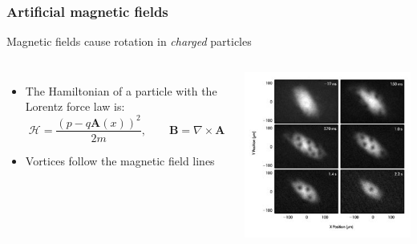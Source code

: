 \documentclass{beamer}
\begin{document}
\begin{frame}
\frametitle{Artificial magnetic fields}
\begin{center}
Magnetic fields cause rotation in \textit{charged} particles
\end{center}
\begin{columns}
\begin{itemize}
\item The Hamiltonian of a particle with the Lorentz force law is:
$$
\mathcal{H} = \frac{(p-q\mathbf{A}(x))^2}{2m}, \qquad \mathbf{B} = \nabla\times\mathbf{A}
$$
\item Vortices follow the magnetic field lines
\end{itemize}
\includegraphics[width=\textwidth]{exp_synth.jpg}
\end{columns}
\end{frame}
\end{document}
